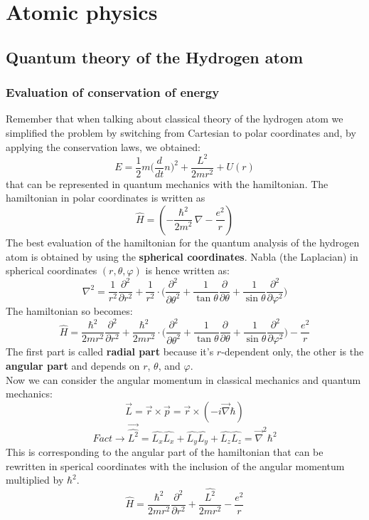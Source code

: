 \graphicspath{{chapters/06/}}
\chapter{Atomic physics}
\section{Quantum theory of the Hydrogen atom}
\subsection{Evaluation of conservation of energy}
Remember that when talking about classical theory of the hydrogen atom we simplified the problem by switching from Cartesian to polar coordinates and, by applying the conservation laws, we obtained:
\[
E=\frac{1}{2}m\bigg(\frac{d}{dt}n\bigg)^2+\frac{L^2}{2mr^2}+U(r)
\]
that can be represented in quantum mechanics with the hamiltonian. The hamiltonian in polar coordinates is written as
\[
\hat{H}=(-\frac{\hbar^2}{2m^2}\, \nabla - \frac{e^2}{r})
\]
The best evaluation of the hamiltonian for the quantum analysis of the hydrogen atom is obtained by using the \textbf{spherical coordinates}. Nabla (the Laplacian) in spherical coordinates $(r,\theta,\varphi)$ is hence written as:
\[
\nabla^2=\frac{1}{r^2}\frac{\partial^2}{\partial r^2}+\frac{1}{r^2}\cdot\bigg(\frac{\partial^2}{\partial \theta^2}+\frac{1}{\tan\theta}\frac{\partial}{\partial\theta}+\frac{1}{\sin\theta}\frac{\partial^2}{\partial\varphi^2}\bigg)
\]
The hamiltonian so becomes:
\[
\hat{H}=\frac{\hbar^2}{2mr^2}\frac{\partial^2}{\partial r^2}+\frac{\hbar^2}{2mr^2}\cdot\bigg(\frac{\partial^2}{\partial \theta^2}+\frac{1}{\tan\theta}\frac{\partial}{\partial\theta}+\frac{1}{\sin\theta}\frac{\partial^2}{\partial\varphi^2}\bigg)-\frac{e^2}{r}
\]
The first part is called \textbf{radial part} because it's $r$-dependent only, the other is the \textbf{angular part} and depends on $r$, $\theta$, and $\varphi$.\\
Now we can consider the angular momentum in classical mechanics and quantum mechanics:
\[
\vec{L}=\vec{r}\times\vec{p}=\vec{r}\times(-i\vec{\nabla}\hbar)
\]
\[
\textit{Fact} \rightarrow \vec{\hat{L^2}}=\hat{L_x}\hat{L_x}+\hat{L_y}\hat{L_y}+\hat{L_z}\hat{L_z}=\vec{\nabla}^2\hbar^2
\]
This is corresponding to the angular part of the hamiltonian that can be rewritten in sperical coordinates with the inclusion of the angular momentum multiplied by $\hbar^2$.
\[
\hat{H}=\frac{\hbar^2}{2mr^2}\frac{\partial^2}{\partial r^2}+\frac{\hat{L^2}}{2mr^2}-\frac{e^2}{r}
\]
